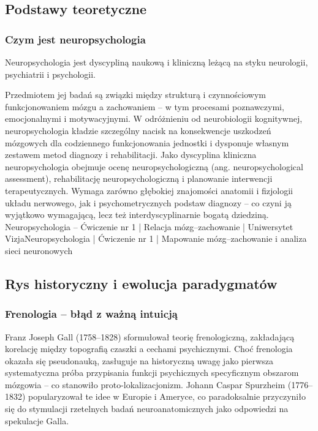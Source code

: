 \documentclass[11pt,a4paper]{article}
\begin{document}
\subsection{Podstawy teoretyczne}

\subsubsection{Czym jest neuropsychologia}
Neuropsychologia jest dyscypliną naukową i kliniczną leżącą na styku neurologii, psychiatrii i psychologii.

Przedmiotem jej badań są związki między strukturą i czynnościowym funkcjonowaniem mózgu a zachowaniem
– w tym procesami poznawczymi, emocjonalnymi i motywacyjnymi. W odróżnieniu od neurobiologii
kognitywnej, neuropsychologia kładzie szczególny nacisk na konsekwencje uszkodzeń mózgowych dla
codziennego funkcjonowania jednostki i dysponuje własnym zestawem metod diagnozy i rehabilitacji.
Jako dyscyplina kliniczna neuropsychologia obejmuje ocenę neuropsychologiczną (ang. neuropsychological
assessment), rehabilitację neuropsychologiczną i planowanie interwencji terapeutycznych. Wymaga zarówno
głębokiej znajomości anatomii i fizjologii układu nerwowego, jak i psychometrycznych podstaw diagnozy – co
czyni ją wyjątkowo wymagającą, lecz też interdyscyplinarnie bogatą dziedziną.
Neuropsychologia – Ćwiczenie nr 1 | Relacja mózg–zachowanie | Uniwersytet VizjaNeuropsychologia | Ćwiczenie nr 1 | Mapowanie mózg–zachowanie i analiza sieci neuronowych

\subsection{Rys historyczny i ewolucja paradygmatów}

\subsubsection{Frenologia – błąd z ważną intuicją}

Franz Joseph Gall (1758–1828) sformułował teorię frenologiczną, zakładającą korelację między topografią
czaszki a cechami psychicznymi. Choć frenologia okazała się pseudonauką, zasługuje na historyczną uwagę
jako pierwsza systematyczna próba przypisania funkcji psychicznych specyficznym obszarom mózgowia – co
stanowiło proto-lokalizacjonizm. Johann Caspar Spurzheim (1776–1832) popularyzował te idee w Europie
i Ameryce, co paradoksalnie przyczyniło się do stymulacji rzetelnych badań neuroanatomicznych jako
odpowiedzi na spekulacje Galla.
\end{document}
